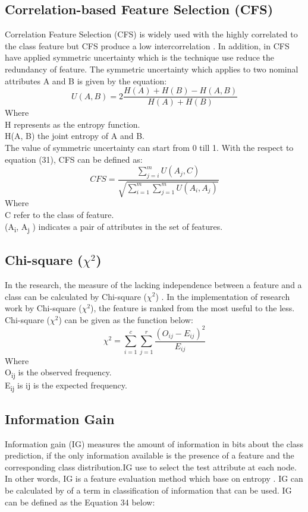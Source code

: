 \documentclass[review]{elsarticle}
\begin{document}
\subsection{Correlation-based Feature Selection (CFS)}
Correlation Feature Selection (CFS) is widely used with the highly correlated to the class feature but CFS produce a low intercorrelation \cite{Hall1999}. In addition, in CFS have applied symmetric uncertainty which is the technique use reduce the redundancy of feature.  The symmetric uncertainty which applies to two nominal attributes A and B is given by the equation: 
\begin{equation}
U(A,B) =2 \dfrac{H(A)+H(B)-H(A,B)}{H(A) + H(B)}
\end{equation}
Where \\
H represents as the entropy function.\\
H(A, B) the joint entropy of A and B. \\
The value of symmetric uncertainty can start from 0 till 1. 
With the respect to equation (31), CFS can be defined as: 
\begin{equation}
	CFS= \dfrac{\sum_{j=i}^m U(A_j,C)}{\sqrt{\sum_{i=1}^m \sum_{j=1}^m U(A_i,A_j)}}
\end{equation}
Where \\
C refer to the class of feature. \\
(A\textsubscript{i}, A\textsubscript{j} ) indicates a pair of attributes in the set of features.


\subsection{Chi-square ($\chi^2$)}
In the research, the measure of the lacking independence between a feature and a class can be calculated by Chi-square ($\chi^2$) \cite{Plackett1983}. In the implementation of research work by Chi-square ($\chi^2$), the feature is ranked from the most useful to the less. Chi-square ($\chi^2$) can be given as the function below: 
\begin{equation}
\chi^2 = \sum_{i=1}^{c} \sum_{j=1}^{r} \dfrac{(O_{ij} - E_{ij})^2}{E_{ij}}
\end{equation}
Where\\
O\textsubscript{ij}  is the observed frequency.\\ 
E\textsubscript{ij} is ij is the expected frequency. 


\subsection{Information Gain}
Information gain (IG) measures the amount of information in bits about the
class prediction, if the only information available is the presence of a feature
and the corresponding class distribution\cite{Roobaert}.IG use to select the test attribute at each node. In other words, IG is a feature evaluation method which base on entropy \cite{Lei2012}. IG can be calculated by of a term in classification of information that can be used.  IG can be defined as the Equation 34 below: 
 
\end{document}
